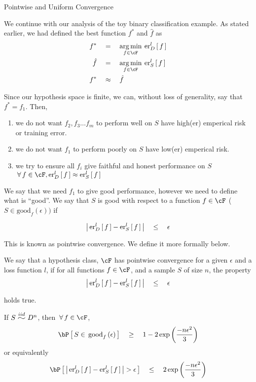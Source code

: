 \documentclass{article}
\begin{document}
\begin{ssection}{Pointwise and Uniform Convergence}

	We continue with our analysis of the toy binary classification example. As stated earlier, we had defined the best function $f^\ast$ and $\hat{f}$ as
	\begin{align*}
		f^\ast	&\eq		\argmin{f \in \cF} \err[_D^l]{f} \\
		\hat{f}	&\eq		\argmin{f \in \cF} \err[_S^l]{f} \\
		f^\ast	&\qapprox	\hat{f}
	\end{align*} \sbr

	Since our hypothesis space is finite, we can, without loss of generality, say that $f^\ast = f_1$. Then,

	\begin{enumerate}[label=(\roman*)]
		\item we do not want $f_2, f_3 \dots f_m$ to perform well on $S$  have high(er) emperical risk or training error.
		\item we do not want $f_1$ to perform poorly on $S$  have low(er) emperical risk.
		\item we try to ensure all $f_i$ give faithful and honest performance on $S$  $\qforall f \in \cF, \err[_D^l]{f} \approx \err[_S^l]{f}$
	\end{enumerate}

	We say that we need $f_1$ to give good performance, however we need to define what is ``good''. We say that $S$ is good with respect to a function $f \in \cF$ ($S \in \text{good}_f(\epsilon))$ if

	\begin{align*}
		\abs{\err[_D^l]{f} - \err[_S^l]{f}}	\qle	\epsilon
	\end{align*} \sbr

	This is known as pointwise convergence. We define it more formally below. \br

	\begin{definition}
		We say that a hypothesis class, $\cF$ has pointwise convergence for a given $\epsilon$ and a loss function $l$, if for all functions $f \in \cF$, and a sample $S$ of size $n$, the property
		\begin{align*}
			\abs{\err[_D^l]{f} - \err[_S^l]{f}}	\qle	\epsilon
		\end{align*}

		holds true.
	\end{definition}

	\begin{theorem}
		If $S \iid D^n$, then $\qforall f \in \cF$,
		\begin{align*}
			\prob{S \in \tfunc[f]{good}{\epsilon}}	\qge	1 - 2 \texp{\frac{-n \epsilon^2}{3}}
		\end{align*}
		or equivalently
		\begin{align*}
			\prob{\abs{\err[_D^l]{f} - \err[_S^l]{f}} > \epsilon}	\qle	2 \texp{\frac{-n \epsilon^2}{3}}
		\end{align*}
		\label{thm:point_convergence}
	\end{theorem}


\end{ssection}
\end{document}

